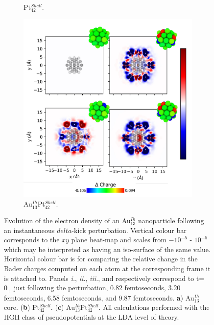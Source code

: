\begin{figure}
\begin{subfigure}{0.45\textwidth}
        \caption{Pt$_{42}^{Shell}$.}
        \label{fig:CS_Dense}
    \end{subfigure}
    \begin{subfigure}{0.45\textwidth}
    \includegraphics[width=\textwidth]{figures/LM/Atomistic/Alloy_Dense.pdf}
    \caption{Au$_{13}^{Ih}$Pt$_{42}^{Shell}$.}
    \label{fig:CS_TD}
\end{subfigure}
    \caption{Evolution of the electron density of an Au$_{13}^{Ih}$ nanoparticle following an instantaneous $delta$-kick perturbation. Vertical colour bar corresponds to the $xy$ plane heat-map and scales from $-10^{-5}$ - $10^{-5}$ which may be interpreted as having an iso-surface of the same value. Horizontal colour bar is for comparing the relative change in the Bader charges computed on each atom at the corresponding frame it is attached to. Panels \textit{i.}, \textit{ii.}, \textit{iii.}, and  respectively correspond to t=$0_{+}$ just following the perturbation, 0.82 femtoseconds, 3.20 femtoseconds, 6.58 femtoseconds, and 9.87 femtoseconds. \textbf{a}) Au$_{13}^{Ih}$ core. (\textbf{b}) Pt$_{42}^{Shell}$. (\textbf{c}) Au$_{13}^{Ih}$Pt$_{42}^{Shell}$. All calculations performed with the HGH class of pseudopotentials \cite{PhysRevB.58.3641} at the LDA level of theory.}
    \label{fig:DFT_CS_Dense}
\end{figure}


